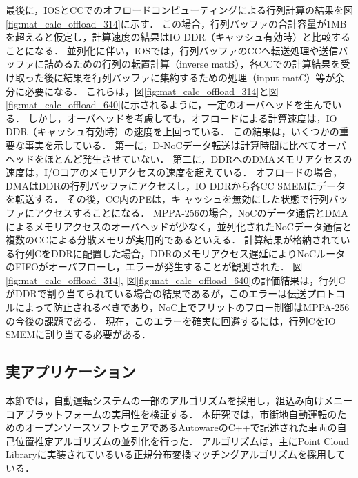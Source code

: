 \documentclass[submit,techrep]{ipsj_v2/UTF8/ipsj}
\begin{document}
最後に，IOSとCCでのオフロードコンピューティングによる行列計算の結果を図\ref{fig:mat_calc_offload_314}に示す．
この場合，行列バッファの合計容量が1MBを超えると仮定し，計算速度の結果はIO DDR（キャッシュ有効時）と比較することになる．
並列化に伴い，IOSでは，行列バッファのCCへ転送処理や送信バッファに詰めるための行列の転置計算（inverse matB），各CCでの計算結果を受け取った後に結果を行列バッファに集約するための処理（input matC）等が余分に必要になる．
これらは，図\ref{fig:mat_calc_offload_314}と図\ref{fig:mat_calc_offload_640}に示されるように，一定のオーバヘッドを生んでいる．
しかし，オーバヘッドを考慮しても，オフロードによる計算速度は，IO DDR（キャッシュ有効時）の速度を上回っている．
この結果は，いくつかの重要な事実を示している．
第一に，D-NoCデータ転送は計算時間に比べてオーバヘッドをほとんど発生させていない．
第二に，DDRへのDMAメモリアクセスの速度は，I/Oコアのメモリアクセスの速度を超えている．
オフロードの場合，DMAはDDRの行列バッファにアクセスし，IO DDRから各CC SMEMにデータを転送する．
その後，CC内のPEは，キ ャッシュを無効にした状態で行列バッファにアクセスすることになる．
MPPA-256の場合，NoCのデータ通信とDMAによるメモリアクセスのオーバヘッドが少なく，並列化されたNoCデータ通信と複数のCCによる分散メモリが実用的であるといえる．
計算結果が格納されている行列CをDDRに配置した場合，DDRのメモリアクセス遅延によりNoCルータのFIFOがオーバフローし，エラーが発生することが観測された．
図\ref{fig:mat_calc_offload_314}, 図\ref{fig:mat_calc_offload_640}の評価結果は，行列CがDDRで割り当てられている場合の結果であるが，このエラーは伝送プロトコルによって防止されるべきであり，NoC上でフリットのフロー制御はMPPA-256の今後の課題である．
現在，このエラーを確実に回避するには，行列CをIO SMEMに割り当てる必要がある．

\subsection{実アプリケーション}
\label{sec:practical_application}
本節では，自動運転システムの一部のアルゴリズムを採用し，組込み向けメニーコアプラットフォームの実用性を検証する．
本研究では，市街地自動運転のためのオープンソースソフトウェアであるAutoware\cite{kato2015open}のC++で記述された車両の自己位置推定アルゴリズムの並列化を行った．
アルゴリズムは，主にPoint Cloud Library\cite{pcl}に実装されているいる正規分布変換マッチングアルゴリズム\cite{magnusson2009three}を採用している．
\end{document}

